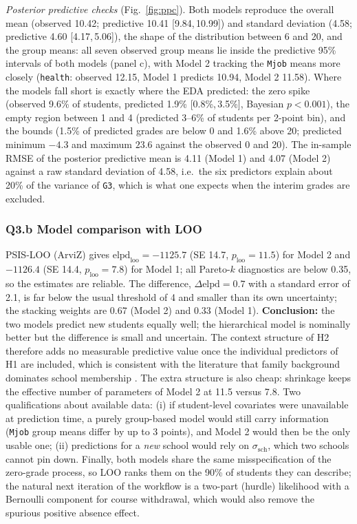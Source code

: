 \documentclass[10pt,a4paper]{article}
\newcommand{\HDI}[2]{[#1,\,#2]}
\newcommand{\code}[1]{\texttt{#1}}
\begin{document}
\emph{Posterior predictive checks} (Fig.~\ref{fig:ppc}). Both models reproduce the overall mean (observed 10.42; predictive 10.41 \HDI{9.84}{10.99}) and standard deviation (4.58; predictive 4.60 \HDI{4.17}{5.06}), the shape of the distribution between 6 and 20, and the group means: all seven observed group means lie inside the predictive 95\% intervals of both models (panel c), with Model 2 tracking the \code{Mjob} means more closely (\code{health}: observed 12.15, Model 1 predicts 10.94, Model 2 11.58). Where the models fall short is exactly where the EDA predicted: the zero spike (observed 9.6\% of students, predicted 1.9\% \HDI{0.8\%}{3.5\%}, Bayesian $p<0.001$), the empty region between 1 and 4 (predicted 3--6\% of students per 2-point bin), and the bounds (1.5\% of predicted grades are below 0 and 1.6\% above 20; predicted minimum $-4.3$ and maximum $23.6$ against the observed 0 and 20). The in-sample RMSE of the posterior predictive mean is 4.11 (Model 1) and 4.07 (Model 2) against a raw standard deviation of 4.58, i.e.\ the six predictors explain about 20\% of the variance of \code{G3}, which is what one expects when the interim grades are excluded.

\subsubsection{Q3.b Model comparison with LOO} PSIS-LOO (ArviZ) gives $\text{elpd}_{\text{loo}}=-1125.7$ (SE 14.7, $p_{\text{loo}}=11.5$) for Model 2 and $-1126.4$ (SE 14.4, $p_{\text{loo}}=7.8$) for Model 1; all Pareto-$k$ diagnostics are below 0.35, so the estimates are reliable. The difference, $\Delta\text{elpd}=0.7$ with a standard error of 2.1, is far below the usual threshold of 4 and smaller than its own uncertainty; the stacking weights are 0.67 (Model 2) and 0.33 (Model 1). \textbf{Conclusion:} the two models predict new students equally well; the hierarchical model is nominally better but the difference is small and uncertain. The context structure of H2 therefore adds no measurable predictive value once the individual predictors of H1 are included, which is consistent with the literature that family background dominates school membership \cite{coleman1966}. The extra structure is also cheap: shrinkage keeps the effective number of parameters of Model 2 at 11.5 versus 7.8. Two qualifications about available data: (i) if student-level covariates were unavailable at prediction time, a purely group-based model would still carry information (\code{Mjob} group means differ by up to 3 points), and Model 2 would then be the only usable one; (ii) predictions for a \emph{new} school would rely on $\sigma_{\text{sch}}$, which two schools cannot pin down. Finally, both models share the same misspecification of the zero-grade process, so LOO ranks them on the 90\% of students they can describe; the natural next iteration of the workflow is a two-part (hurdle) likelihood with a Bernoulli component for course withdrawal, which would also remove the spurious positive absence effect.
\end{document}
